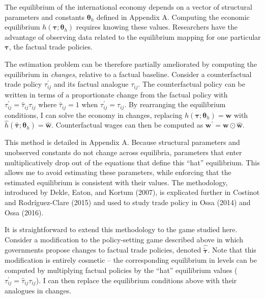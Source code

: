 \documentclass{puthesis}
\begin{document}
The equilibrium of the international economy depends on a vector of
structural parameters and constants \(\bm{\theta}_h\) defined in
Appendix A. Computing the economic equilibrium
\(h(\bm{\tau}; \bm{\theta}_h)\) requires knowing these values.
Researchers have the advantage of observing data related to the
equilibrium mapping for one particular \(\bm{\tau}\), the factual trade
policies.

The estimation problem can be therefore partially ameliorated by
computing the equilibrium in \emph{changes}, relative to a factual
baseline. Consider a counterfactual trade policy \(\tau_{ij}^\prime\)
and its factual analogue \(\tau_{ij}\). The counterfactual policy can be
written in terms of a proportionate change from the factual policy with
\(\tau_{ij}^\prime = \hat{\tau}_{ij} \tau_{ij}\) where
\(\hat{\tau}_{ij} = 1\) when \(\tau_{ij}^\prime = \tau_{ij}\). By
rearranging the equilibrium conditions, I can solve the economy in
changes, replacing \(h(\bm{\tau}; \bm{\theta}_h) = \bm{w}\) with
\(\hat{h}(\hat{\bm{\tau}}; \bm{\theta}_h) = \hat{\bm{w}}\).
Counterfactual wages can then be computed as
\(\bm{w}^\prime = \bm{w} \odot \hat{\bm{w}}\).

This method is detailed in Appendix A. Because structural parameters and
unobserved constants do not change across equilibria, parameters that
enter multiplicatively drop out of the equations that define this
``hat'' equilibrium. This allows me to avoid estimating these
parameters, while enforcing that the estimated equilibrium is consistent
with their values. The methodology, introduced by Dekle, Eaton, and
Kortum (2007), is explicated further in Costinot and Rodríguez-Clare
(2015) and used to study trade policy in Ossa (2014) and Ossa (2016).

It is straightforward to extend this methodology to the game studied
here. Consider a modification to the policy-setting game described above
in which governments propose changes to factual trade policies, denoted
\(\hat{\tilde{\bm{\tau}}}\). Note that this modification is entirely
cosmetic -- the corresponding equilibrium in levels can be computed by
multiplying factual policies by the ``hat'' equilibrium values
(\(\tau_{ij}^\prime = \hat{\tau}_{ij} \tau_{ij}\)). I can then replace
the equilibrium conditions above with their analogues in changes.
\end{document}

